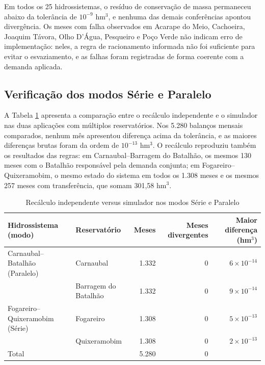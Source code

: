 Em todos os 25 hidrossistemas, o resíduo de conservação de massa permaneceu abaixo da tolerância de $10^{-9}$ hm$^3$, e nenhuma das demais conferências apontou divergência. Os meses com falha observados em Acarape do Meio, Cachoeira, Joaquim Távora, Olho D'Água, Pesqueiro e Poço Verde não indicam erro de implementação: neles, a regra de racionamento informada não foi suficiente para evitar o esvaziamento, e as falhas foram registradas de forma coerente com a demanda aplicada.

\subsection{Verificação dos modos Série e Paralelo}
\label{subsec:resultado-verif-multi}

A Tabela \ref{tab:verif-multi} apresenta a comparação entre o recálculo independente e o simulador nas duas aplicações com múltiplos reservatórios. Nos 5.280 balanços mensais comparados, nenhum mês apresentou diferença acima da tolerância, e as maiores diferenças brutas foram da ordem de $10^{-13}$ hm$^3$. O recálculo reproduziu também os resultados das regras: em Carnaubal--Barragem do Batalhão, os mesmos 130 meses com o Batalhão responsável pela demanda conjunta; em Fogareiro--Quixeramobim, o mesmo estado do sistema em todos os 1.308 meses e os mesmos 257 meses com transferência, que somam 301,58 hm$^3$.

\begin{table}[H]
    \captionsetup{width=15cm}
    \caption{Recálculo independente versus simulador nos modos Série e Paralelo}
    \label{tab:verif-multi}
    \centering
    \footnotesize
    \setlength{\tabcolsep}{4pt}
    \begin{tabular}{llrrr}
        \toprule
        Hidrossistema (modo) & Reservatório & Meses & Meses divergentes & Maior diferença (hm$^3$) \\
        \midrule
        Carnaubal--Batalhão (Paralelo) & Carnaubal & 1.332 & 0 & $6\times10^{-14}$ \\
         & Barragem do Batalhão & 1.332 & 0 & $9\times10^{-14}$ \\
        Fogareiro--Quixeramobim (Série) & Fogareiro & 1.308 & 0 & $5\times10^{-13}$ \\
         & Quixeramobim & 1.308 & 0 & $2\times10^{-13}$ \\
        \midrule
        Total & & 5.280 & 0 & \\
        \bottomrule
    \end{tabular}
\end{table}

